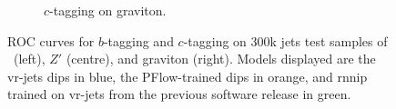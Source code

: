 \begin{figure}
\begin{subfigure}[t]{0.32\textwidth}
      \caption{$c$-tagging on graviton.}
      \label{fig:dipsVRROCgrc}
    \end{subfigure}
    \vspace{-0.15cm}
    \caption{ROC curves for $b$-tagging and $c$-tagging on 300k jets test samples of \ttb\ (left), $Z'$ (centre), and graviton (right). Models displayed are the \gls{vr}-jets \gls{dips} in blue, the PFlow-trained \gls{dips} in orange, and \gls{rnnip} trained on \gls{vr}-jets from the previous software release in green.}
    \label{fig:dipsVRROC}
  \end{figure}
